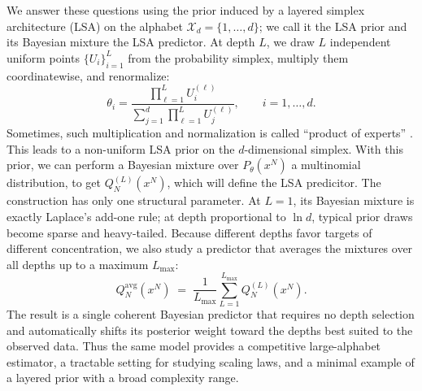 \documentclass[11pt]{article}
\newcommand{\Nseq}{N}
\begin{document}
We answer these questions using the prior induced by a layered simplex
architecture (LSA) on the alphabet \(\mathcal X_d=\{1,\ldots,d\}\); we
call it the LSA prior and its Bayesian mixture the LSA predictor.
At depth \(L\), we draw \(L\) independent uniform points $\{U_i\}_{i=1}^L$ from the
probability simplex, multiply them coordinatewise, and renormalize:
\[
  \theta_i
  =
  \frac{\prod_{\ell=1}^L U^{(\ell)}_i}
       {\sum_{j=1}^d \prod_{\ell=1}^L U^{(\ell)}_j},
  \qquad i=1,\ldots,d.
\]
Sometimes, such multiplication and normalization is called ``product of experts'' \cite{Hinton1999ProductsOE}. This leads to a non-uniform LSA prior on the $d$-dimensional simplex. With this prior, we can perform a Bayesian mixture over $P_\theta(x^N)$ a multinomial distribution, to get $Q_N^{(L)}(x^N)$, which will define the LSA predicitor. The construction has only one structural parameter.
At \(L=1\), its Bayesian mixture is exactly Laplace's add-one rule; at depth
proportional to \(\ln d\), typical prior draws become sparse and
heavy-tailed.
Because different depths favor targets of different concentration, we also
study a predictor that averages the mixtures over all depths up to a maximum
\(L_{\max}\):
\begin{equation}
\label{eq:depth-average}
  Q^{\mathrm{avg}}_\Nseq(x^\Nseq)
  \;=\;
  \frac{1}{L_{\max}}\sum_{L=1}^{L_{\max}} Q^{(L)}_\Nseq(x^\Nseq).
\end{equation}
The result is a single coherent Bayesian predictor that requires no depth
selection and automatically shifts its posterior weight toward the depths
best suited to the observed data.
Thus the same model provides a competitive large-alphabet estimator, a
tractable setting for studying scaling laws, and a minimal example of a
layered prior with a broad complexity range.
\end{document}
